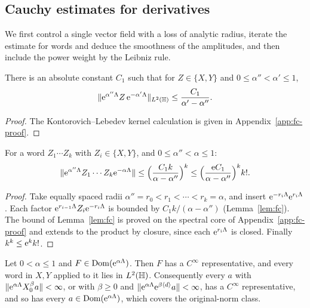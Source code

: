 \subsection{Cauchy estimates for derivatives}\label{subsec:dd-fc}

We first control a single vector field with a loss of analytic radius, iterate the estimate for words and deduce the
smoothness of the amplitudes, and then include the power weight by the Leibniz rule.

\begin{lemma}\label{lem:fc}
There is an absolute constant $C_1$ such that for $Z\in\{X,Y\}$ and $0\le\alpha''<\alpha'\le1$,
\[
\lVert \mathrm{e}^{\alpha''\Lambda}Z\,\mathrm{e}^{-\alpha'\Lambda}\rVert_{L^2(\mathbb{H})}\le\frac{C_1}{\alpha'-\alpha''}.
\]
\end{lemma}

\begin{proof}
The Kontorovich--Lebedev kernel calculation is given in Appendix~\ref{app:fc-proof}.
\end{proof}

\begin{lemma}\label{lem:wc}
For a word $Z_1\cdots Z_k$ with $Z_i\in\{X,Y\}$, and $0\le\alpha''<\alpha\le1$:
\[
\lVert \mathrm{e}^{\alpha''\Lambda}Z_1\cdots Z_k\mathrm{e}^{-\alpha\Lambda}\rVert\le\Bigl(\frac{C_1k}{\alpha-\alpha''}\Bigr)^k\le\Bigl(\frac{\mathrm{e} C_1}{\alpha-\alpha''}\Bigr)^k k!.
\]
\end{lemma}

\begin{proof}
Take equally spaced radii $\alpha''=r_0<r_1<\cdots<r_k=\alpha$, and insert $\mathrm{e}^{-r_i\Lambda}\mathrm{e}^{r_i\Lambda}$.
Each factor $\mathrm{e}^{r_{i-1}\Lambda}Z_i\mathrm{e}^{-r_i\Lambda}$ is bounded by $C_1k/(\alpha-\alpha'')$ (Lemma~\ref{lem:fc}). The bound of Lemma~\ref{lem:fc} is proved on the spectral core of Appendix~\ref{app:fc-proof} and extends to the product by closure, since each $\mathrm{e}^{r_i\Lambda}$ is closed. Finally $k^k\le\mathrm{e}^k k!$. \qedhere
\end{proof}

\begin{lemma}[regularity]\label{lem:lift}
Let $0<\alpha\le1$ and $F\in\operatorname{Dom}(\mathrm{e}^{\alpha\Lambda})$. Then $F$ has a $C^\infty$ representative, and every word in
$X,Y$ applied to it lies in $L^2(\mathbb{H})$. Consequently every $a$ with $\lVert \mathrm{e}^{\alpha\Lambda}X_0^\beta a\rVert<\infty$, or with $\beta\ge0$ and
$\lVert \mathrm{e}^{\alpha\Lambda}\mathrm{e}^{\beta\langle d\rangle}a\rVert<\infty$, has a $C^\infty$ representative, and so has every
$a\in\operatorname{Dom}(\mathrm{e}^{\alpha\Lambda})$, which covers the original-norm class.
\end{lemma}

